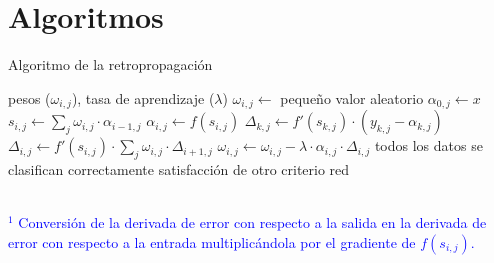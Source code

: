 \chapter{Algoritmos} \label{Appendix:Algorithms}

\begin{algorithm}
\caption{Algoritmo de la retropropagación}
\label{alg:Backpropagation}
\begin{algorithmic}[1]
        \State \VARIABLES pesos ($\omega_{i,j}$), tasa de aprendizaje ($\lambda$)
         
            \State $\omega_{i,j} \gets$ pequeño valor aleatorio
        \EndFor
        \Repeat
             
                    \State $\alpha_{0,j} \gets x$ 
                \EndFor
                        \State $s_{i,j} \gets \sum\limits_{j} \omega_{i,j}\cdot \alpha_{i-1,j}$
                        \State $\alpha_{i,j} \gets f(s_{i,j})$ 
                    \EndFor
                \EndFor
                 
                    \State $\Delta_{k,j} \gets f'(s_{k,j})\cdot (y_{k,j} - \alpha_{k,j})$ \textcolor{blue}{\footnotemark[1]}
                \EndFor
                        \State $\Delta_{i,j} \gets f'(s_{i,j})\cdot \sum\limits_{j} \omega_{i,j}\cdot \Delta_{i+1,j}$ \textcolor{blue}{\footnotemark[1]}
                    \EndFor
                \EndFor
                 
                    \State $\omega_{i,j} \gets \omega_{i,j} - \lambda \cdot \alpha_{i,j} \cdot \Delta_{i,j}$ 
                \EndFor
            \EndFor
        \Until todos los datos se clasifican correctamente \OR satisfacción de otro criterio
        \State \Return red
    \EndFunction
\end{algorithmic}
\textcolor{blue}{\footnotesize{\\ $^1$ Conversión de la derivada de error con respecto a la salida en la derivada de error con respecto a la entrada multiplicándola por el gradiente de $f(s_{i,j})$.}}
\end{algorithm}

